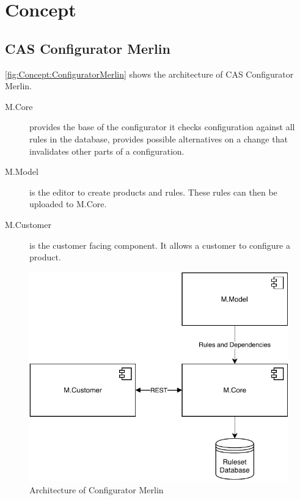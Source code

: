\chapter{Concept}
\label{ch:Concept}

\section{CAS Configurator Merlin}
\label{sec:Concept:ConfiguratorMerlin}

\autoref{fig:Concept:ConfiguratorMerlin} shows the architecture of CAS Configurator Merlin.
\begin{description}
    \item[M.Core] provides the base of the configurator it checks configuration against all rules in the database, provides possible alternatives on a change that invalidates other parts of a configuration.
    \item[M.Model] is the editor to create products and rules. These rules can then be uploaded to M.Core.
    \item[M.Customer] is the customer facing component. It allows a customer to configure a product.
\end{description}

\begin{figure}
    \centering
    \includegraphics{./figures/40_concept/MerlinConfigurator.pdf}
    \caption{Architecture of Configurator Merlin \cite[Fig. 4.1]{raabKollaborativeProduktkonfigurationEchtzeit2019}}
    \label{fig:Concept:ConfiguratorMerlin}
\end{figure}

